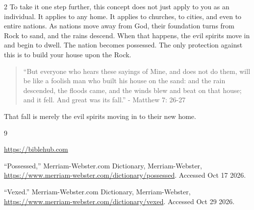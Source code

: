 \documentclass[10pt]{article}
\begin{document}
\begin{multicols}{2}
To take it one step further, this concept does not just apply to you as an individual. It applies to any home. It applies to churches, to cities, and even to entire nations. As nations move away from God, their foundation turns from Rock to sand, and the rains descend. When that happens, the evil spirits move in and begin to dwell. The nation becomes possessed. The only protection against this is to build your house upon the Rock.


\begin{quotation}
``But everyone who hears these sayings of Mine, and does not do them, will be like a foolish man who built his house on the sand:  and the rain descended, the floods came, and the winds blew and beat on that house; and it fell. And great was its fall.'' - Matthew 7:
26-27
\end{quotation}
That fall is merely the evil spirits moving in to their new home.


\begin{thebibliography}{9}
{\footnotesize
	 \url{https://biblehub.com}
	
	 ``Possessed,'' Merriam-Webster.com Dictionary, Merriam-Webster, \url{https://www.merriam-webster.com/dictionary/possessed}. Accessed Oct 17 2026.
	
	 ``Vexed.'' Merriam-Webster.com Dictionary, Merriam-Webster, \url{https://www.merriam-webster.com/dictionary/vexed}. Accessed Oct 29 2026.
}
\end{thebibliography}

\end{multicols}


\end{document}
